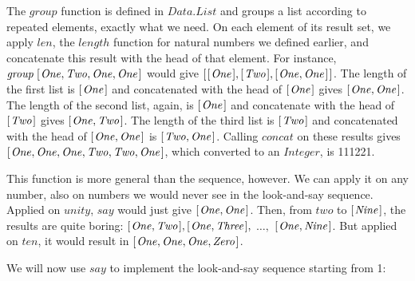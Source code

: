 \documentclass{scrreprt}
\newcommand{\Conid}[1]{\mathit{#1}}
\newcommand{\Varid}[1]{\mathit{#1}}
\begin{document}
The \ensuremath{\Varid{group}} function is defined in \ensuremath{\Conid{\Conid{Data}.List}}
and groups a list according to repeated elements,
exactly what we need.
On each element of its result set,
we apply \ensuremath{\Varid{len}}, the \ensuremath{\Varid{length}} function
for natural numbers we defined earlier,
and concatenate this result with the head of that element.
For instance, \ensuremath{\Varid{group}\;[\mskip1.5mu \Conid{One},\Conid{Two},\Conid{One},\Conid{One}\mskip1.5mu]} would give
\ensuremath{[\mskip1.5mu [\mskip1.5mu \Conid{One}\mskip1.5mu],[\mskip1.5mu \Conid{Two}\mskip1.5mu],[\mskip1.5mu \Conid{One},\Conid{One}\mskip1.5mu]\mskip1.5mu]}.
The length of the first list is \ensuremath{[\mskip1.5mu \Conid{One}\mskip1.5mu]} and concatenated
with the head of \ensuremath{[\mskip1.5mu \Conid{One}\mskip1.5mu]} gives \ensuremath{[\mskip1.5mu \Conid{One},\Conid{One}\mskip1.5mu]}.
The length of the second list, again, is \ensuremath{[\mskip1.5mu \Conid{One}\mskip1.5mu]} and
concatenate with the head of \ensuremath{[\mskip1.5mu \Conid{Two}\mskip1.5mu]} gives \ensuremath{[\mskip1.5mu \Conid{One},\Conid{Two}\mskip1.5mu]}.
The length of the third list is \ensuremath{[\mskip1.5mu \Conid{Two}\mskip1.5mu]} and concatenated
with the head of \ensuremath{[\mskip1.5mu \Conid{One},\Conid{One}\mskip1.5mu]} is \ensuremath{[\mskip1.5mu \Conid{Two},\Conid{One}\mskip1.5mu]}.
Calling \ensuremath{\Varid{concat}} on these results gives
\ensuremath{[\mskip1.5mu \Conid{One},\Conid{One},\Conid{One},\Conid{Two},\Conid{Two},\Conid{One}\mskip1.5mu]}, which converted to an \ensuremath{\Conid{Integer}},
is 111221.

This function is more general than the sequence, however.
We can apply it on any number, also on numbers
we would never see in the look-and-say sequence.
Applied on \ensuremath{\Varid{unity}}, \ensuremath{\Varid{say}} would just give \ensuremath{[\mskip1.5mu \Conid{One},\Conid{One}\mskip1.5mu]}.
Then, from \ensuremath{\Varid{two}} to \ensuremath{[\mskip1.5mu \Conid{Nine}\mskip1.5mu]}, the results are quite boring:
\ensuremath{[\mskip1.5mu \Conid{One},\Conid{Two}\mskip1.5mu],[\mskip1.5mu \Conid{One},\Conid{Three}\mskip1.5mu],} $\dots,$ \ensuremath{[\mskip1.5mu \Conid{One},\Conid{Nine}\mskip1.5mu]}.
But applied on \ensuremath{\Varid{ten}}, it would result in \ensuremath{[\mskip1.5mu \Conid{One},\Conid{One},\Conid{One},\Conid{Zero}\mskip1.5mu]}.

We will now use \ensuremath{\Varid{say}} to implement the look-and-say sequence
starting from 1:
\end{document}
